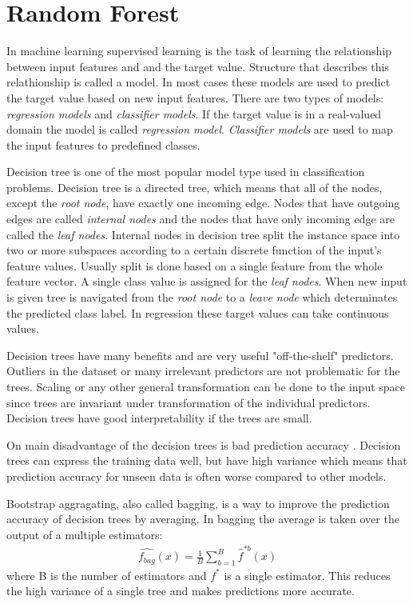 \section{Random Forest}
\label{ss:randomforest}
In machine learning supervised learning is the task of learning the relationship between input features and and the target value. Structure that describes this relathionship is called a model. In most cases these models are used to predict the target value based on new input features. There are two types of models: \textit{regression models} and \textit{classifier models}. If the target value is in a real-valued domain the model is called \textit{regression model}. \textit{Classifier models} are used to map the input features to predefined classes. \cite{rokach2005top}

Decision tree is one of the most popular model type used in classification problems. Decision tree is a directed tree, which means that all of the nodes, except the \textit{root node}, have exactly one incoming edge. Nodes that have outgoing edges are called \textit{internal nodes} and the nodes that have only incoming edge are called the \textit{leaf nodes}. Internal nodes in decision tree split the instance space into two or more subspaces according to a certain discrete function of the input's feature values. Usually split is done based on a single feature from the whole feature vector. A single class value is assigned for the \textit{leaf nodes}. When new input is given tree is navigated from the \textit{root node} to a \textit{leave node} which determinates the predicted class label. In regression these target values can take continuous values. \cite{rokach2005top}

Decision trees have many benefits and are very useful "off-the-shelf" predictors. Outliers in the dataset or many irrelevant predictors are not problematic for the trees. Scaling or any other general transformation can be done to the input space since trees are invariant under transformation of the individual predictors. \cite{friedman2001elements} Decision trees have good interpretability if the trees are small.

On main disadvantage of the decision trees is bad prediction accuracy \cite{friedman2001elements}. Decision trees can express the training data well, but have high variance which means that prediction accuracy for unseen data is often worse compared to other models.

Bootstrap aggragating, also called bagging, is a way to improve the prediction accuracy of decision trees by averaging. In bagging the average is taken over the output of a multiple estimators:
\begin{align}
    \hat {f_{bag}}(x) = \frac{1}{B}\sum_{b = 1}^{B} \hat {f}^{*b}(x)
\end{align}
where B is the number of estimators and ${f}^{*}$ is a single estimator. This reduces the high variance of a single tree and makes predictions more accurate.

